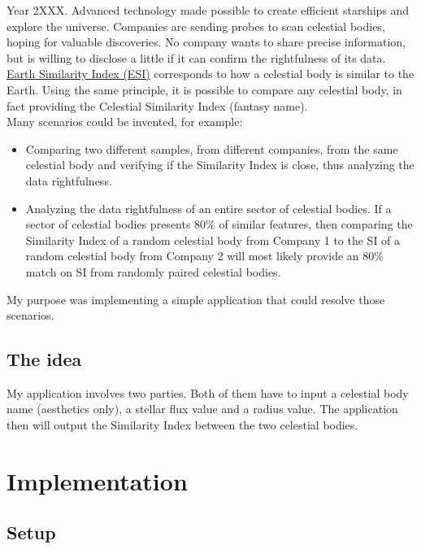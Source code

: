 \documentclass[a4paper]{article}
\begin{document}
Year 2XXX. Advanced technology made possible to create efficient starships and explore the universe. Companies are sending probes to scan celestial bodies, hoping for valuable discoveries. No company wants to share precise information, but is willing to disclose a little if it can confirm the rightfulness of its data. \\ \href{http://phl.upr.edu/projects/earth-similarity-index-esi}{Earth Similarity Index (ESI)} corresponds to how a celestial body is similar to the Earth. Using the same principle, it is possible to compare any celestial body, in fact providing the Celestial Similarity Index (fantasy name). \\
Many scenarios could be invented, for example:

\begin{itemize}
    \item Comparing two different samples, from different companies, from the same celestial body and verifying if the Similarity Index is close, thus analyzing the data rightfulness.
    \item Analyzing the data rightfulness of an entire sector of celestial bodies. If a sector of celestial bodies presents 80\% of similar features, then comparing the Similarity Index of a random celestial body from Company 1 to the SI of a random celestial body from Company 2 will most likely provide an 80\% match on SI from randomly paired celestial bodies.
\end{itemize}

My purpose was implementing a simple application that could resolve those scenarios.

\subsection{The idea}

My application involves two parties. Both of them have to input a celestial body name (aesthetics only), a stellar flux value and a radius value. The application then will output the Similarity Index between the two celestial bodies.

\section{Implementation}

\subsection{Setup}
\end{document}
